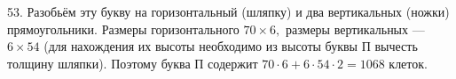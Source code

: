 53. Разобьём эту букву на горизонтальный (шляпку) и два вертикальных (ножки) прямоугольники. Размеры горизонтального $70\times6,$ размеры вертикальных --- $6\times54$ (для нахождения их высоты необходимо из высоты буквы П вычесть толщину шляпки). Поэтому буква П содержит $70\cdot6+6\cdot54\cdot2=1068$ клеток.\\
